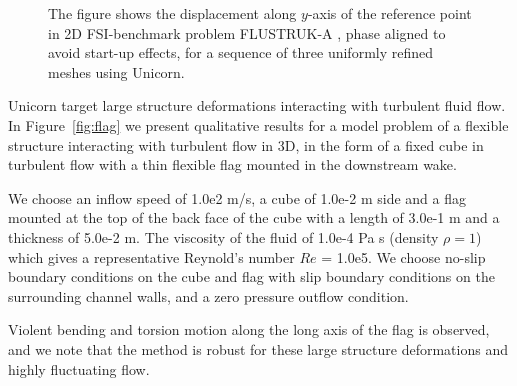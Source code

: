 \begin{figure}[!h]
\caption{
The figure shows the displacement along $y$-axis of the reference point in 2D FSI-benchmark problem FLUSTRUK-A  \citep{HoffmanJanssonStockli2011}, phase aligned to avoid start-up effects, for a sequence of three uniformly refined meshes using Unicorn.
}
\label{fig:flustruk}
\end{figure}

Unicorn target large structure deformations interacting with turbulent fluid flow. In Figure~\ref{fig:flag} we present qualitative results for a model problem of a flexible structure interacting
with turbulent flow in 3D, in the form of a fixed cube in turbulent flow with a thin flexible flag mounted in the downstream wake.

We choose an inflow speed of 1.0e2 m/s, a cube of 1.0e-2 m side and a flag mounted at the top of the back face of the cube with a length of 3.0e-1 m and a thickness of 5.0e-2 m. The viscosity of the fluid of 1.0e-4 Pa s (density $\rho=1$) which gives a representative Reynold's number $Re$ = 1.0e5. We choose no-slip boundary conditions on the cube and flag with slip boundary conditions on the surrounding channel walls, and a zero pressure outflow condition.

Violent bending and torsion motion along the long axis of the flag is observed, and we note that the
method is robust for these large structure deformations and highly fluctuating flow.

